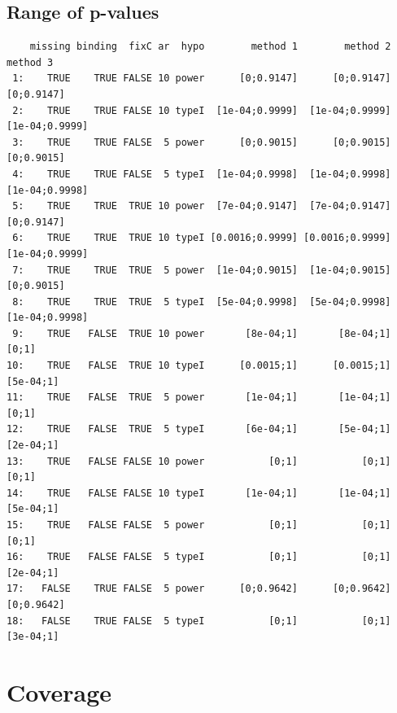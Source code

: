\documentclass[12pt]{article}
\begin{document}
\subsection{Range of p-values}
\label{sec:org4b25add}

\begin{verbatim}
    missing binding  fixC ar  hypo        method 1        method 2       method 3
 1:    TRUE    TRUE FALSE 10 power      [0;0.9147]      [0;0.9147]     [0;0.9147]
 2:    TRUE    TRUE FALSE 10 typeI  [1e-04;0.9999]  [1e-04;0.9999] [1e-04;0.9999]
 3:    TRUE    TRUE FALSE  5 power      [0;0.9015]      [0;0.9015]     [0;0.9015]
 4:    TRUE    TRUE FALSE  5 typeI  [1e-04;0.9998]  [1e-04;0.9998] [1e-04;0.9998]
 5:    TRUE    TRUE  TRUE 10 power  [7e-04;0.9147]  [7e-04;0.9147]     [0;0.9147]
 6:    TRUE    TRUE  TRUE 10 typeI [0.0016;0.9999] [0.0016;0.9999] [1e-04;0.9999]
 7:    TRUE    TRUE  TRUE  5 power  [1e-04;0.9015]  [1e-04;0.9015]     [0;0.9015]
 8:    TRUE    TRUE  TRUE  5 typeI  [5e-04;0.9998]  [5e-04;0.9998] [1e-04;0.9998]
 9:    TRUE   FALSE  TRUE 10 power       [8e-04;1]       [8e-04;1]          [0;1]
10:    TRUE   FALSE  TRUE 10 typeI      [0.0015;1]      [0.0015;1]      [5e-04;1]
11:    TRUE   FALSE  TRUE  5 power       [1e-04;1]       [1e-04;1]          [0;1]
12:    TRUE   FALSE  TRUE  5 typeI       [6e-04;1]       [5e-04;1]      [2e-04;1]
13:    TRUE   FALSE FALSE 10 power           [0;1]           [0;1]          [0;1]
14:    TRUE   FALSE FALSE 10 typeI       [1e-04;1]       [1e-04;1]      [5e-04;1]
15:    TRUE   FALSE FALSE  5 power           [0;1]           [0;1]          [0;1]
16:    TRUE   FALSE FALSE  5 typeI           [0;1]           [0;1]      [2e-04;1]
17:   FALSE    TRUE FALSE  5 power      [0;0.9642]      [0;0.9642]     [0;0.9642]
18:   FALSE    TRUE FALSE  5 typeI           [0;1]           [0;1]      [3e-04;1]
\end{verbatim}

\clearpage

\section{Coverage}
\label{sec:org52d83ae}
\end{document}
